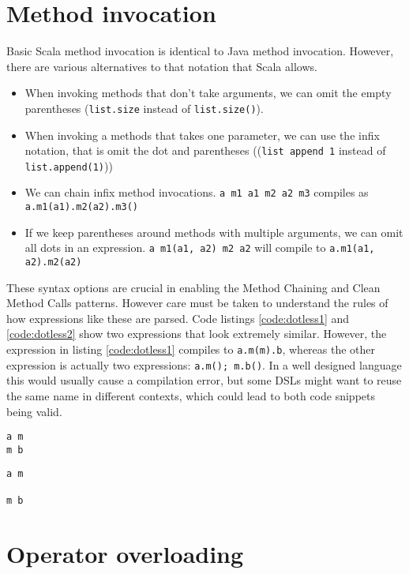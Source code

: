 \section{Method invocation}

Basic Scala method invocation is identical to Java method invocation. However, there are various alternatives to that notation that Scala allows.

\begin{itemize}
	\item When invoking methods that don't take arguments, we can omit the empty parentheses (\texttt{list.size} instead of \texttt{list.size()}).
	\item When invoking a methods that takes one parameter, we can use the infix notation, that is omit the dot and parentheses ((\texttt{list append 1} instead of \texttt{list.append(1)}))
	\item We can chain infix method invocations. \texttt{a m1 a1 m2 a2 m3} compiles as \texttt{a.m1(a1).m2(a2).m3()}
	\item If we keep parentheses around methods with multiple arguments, we can omit all dots in an expression. \texttt{a m1(a1, a2) m2 a2} will compile to \texttt{a.m1(a1, a2).m2(a2)}
\end{itemize}

These syntax options are crucial in enabling the Method Chaining and Clean Method Calls patterns. However care must be taken to understand the rules of how expressions like these are parsed. Code listings \ref{code:dotless1} and \ref{code:dotless2} show two expressions that look extremely similar. However, the expression in listing \ref{code:dotless1} compiles to \texttt{a.m(m).b}, whereas the other expression is actually two expressions: \texttt{a.m(); m.b()}. In a well designed language this would usually cause a compilation error, but some DSLs might want to reuse the same name in different contexts, which could lead to both code snippets being valid.


\begin{lstlisting}[caption=Parsing quirks, label=code:dotless1]
a m
m b
\end{lstlisting}

\begin{lstlisting}[caption=Parsing quirks, label=code:dotless2]
a m

m b
\end{lstlisting}

\section{Operator overloading}

